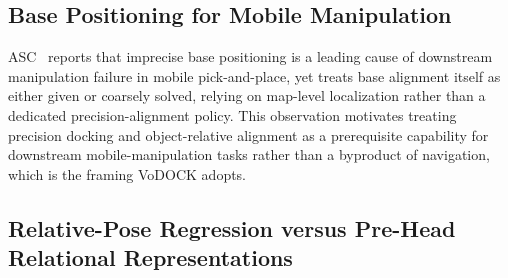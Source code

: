 \documentclass[letterpaper, 10 pt, conference]{IEEEtran}  %
\begin{document}
\subsection{Base Positioning for Mobile Manipulation}
ASC~\cite{yokoyama2024asc} reports that imprecise base positioning is a leading cause of downstream manipulation failure in mobile pick-and-place, yet treats base alignment itself as either given or coarsely solved, relying on map-level localization rather than a dedicated precision-alignment policy. This observation motivates treating precision docking and object-relative alignment as a prerequisite capability for downstream mobile-manipulation tasks rather than a byproduct of navigation, which is the framing VoDOCK adopts.

\subsection{Relative-Pose Regression versus Pre-Head Relational Representations}
\end{document}
